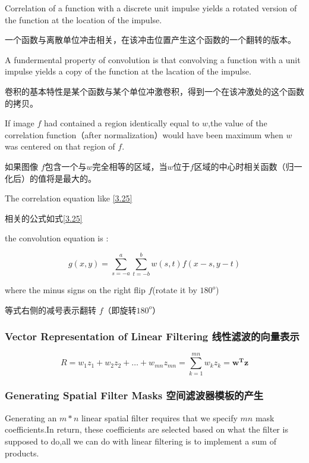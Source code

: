 \documentclass[a4paper,12pt]{article}
\numberwithin{equation}{section}%
\begin{document}
Correlation of a function with a discrete unit impulse yields a rotated version of the function at the location of the impulse.

一个函数与离散单位冲击相关，在该冲击位置产生这个函数的一个翻转的版本。

A fundermental property of convolution is that convolving a function with a unit impulse yields a copy of the function at the lacation of the impulse.

卷积的基本特性是某个函数与某个单位冲激卷积，得到一个在该冲激处的这个函数的拷贝。

If image $f$ had contained a region identically equal to $w$,the value of the correlation function（after normalization）would have been maximum when $w$ was centered on that region of $f$.

如果图像 $f$包含一个与$w$完全相等的区域，当$w$位于$f$区域的中心时相关函数（归一化后）的值将是最大的。

The correlation equation like \ref{3.25}

相关的公式如式\ref{3.25}

the convolution equation is :

\begin{equation} \label {3.26}
g(x,y)=\sum_{s=-a}^{a}\sum_{t=-b}^{b}w(s,t)f(x-s,y-t)
\end{equation}

where the minus signs on the right flip $f$(rotate it by $180^{o}$)

等式右侧的减号表示翻转 $f$（即旋转$180^{o}$）

\subsubsection{Vector Representation of Linear Filtering 线性滤波的向量表示}

\begin{equation} \label {3.27}
R=w_{1}z_{1}+w_{2}z_{2}+\ldots +w_{mn}z_{mn}
=\sum_{k=1}^{mn}w_{k}z_{k}
=\boldsymbol{w^{T}z}
\end{equation}

\subsubsection{Generating Spatial Filter Masks 空间滤波器模板的产生}

Generating an $m*n$ linear spatial filter requires  that we specify $mn$ mask coefficients.In return, these coefficients are selected based on what the filter is supposed to do,all we can do with linear filtering is to implement a sum of products.
\end{document}
